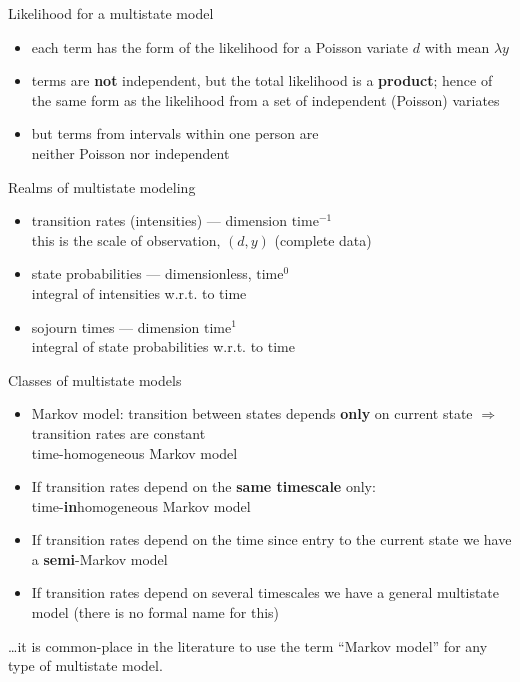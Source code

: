\begin{frame}{Likelihood for a multistate model}
  \begin{itemize}
    \item each term has the form of the likelihood for a Poisson
      variate $d$ with mean $\lambda y$
  \item terms are \textbf{not} independent, but the total
    likelihood is a \textbf{product}; hence of the same form as the
    likelihood from a set of independent (Poisson) variates
  \item but terms from intervals within one person are\\
    neither Poisson nor independent
  \end{itemize}
\end{frame}

\begin{frame}{Realms of multistate modeling}
  \begin{itemize}
  \item transition rates (intensities) --- dimension \alert<4>{$\textrm{time}^{-1}$}\\
    this is the scale of observation, $(d,y)$ (complete data)
  \item state probabilities --- dimensionless, \alert<4>{$\textrm{time}^{0}$}\\
    \alert<4>{integral} of intensities w.r.t. to time
  \item sojourn times --- dimension \alert<4>{$\textrm{time}^{1}$}\\
    \alert<4>{integral} of state probabilities w.r.t. to time
  \end{itemize}
\end{frame}

\begin{frame}{Classes of multistate models}
  \begin{itemize}
  \item Markov model: transition between states depends \textbf{only}
    on current state $\Rightarrow$ transition rates are constant\\
    \alert<5->{time-homogeneous Markov model}
  \item If transition rates depend on the \textbf{same timescale}
    only:\\ \alert<5->{time-\textbf{in}homogeneous Markov model}
  \item If transition rates depend on the time since entry to the
    current state we have a \alert<5->{\textbf{semi}-Markov model}
  \item If transition rates depend on several timescales we have a
    \alert<5->{general multistate model} (there is no formal name for this)
  \end{itemize}
  \pause
  \ldots it is common-place in the literature to use the term ``Markov
  model'' for any type of multistate model.
\end{frame}

